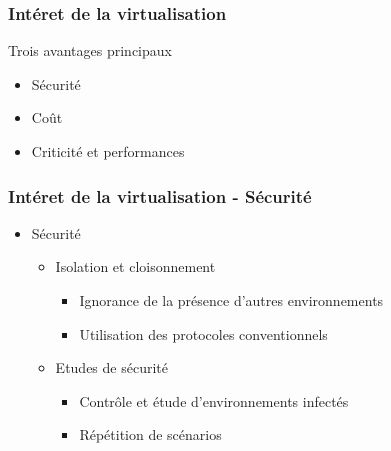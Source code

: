   \begin{frame}
    \frametitle{Intéret de la virtualisation}
    Trois avantages principaux
    \begin{itemize}
      \item Sécurité
      \item Coût
      \item Criticité et performances
    \end{itemize}
  \end{frame}
    
  \begin{frame}
    \frametitle{Intéret de la virtualisation - Sécurité}
    \begin{itemize}
      \item Sécurité
      \begin{itemize}
        \item Isolation et cloisonnement
        \begin{itemize}
          \item Ignorance de la présence d’autres environnements
          \item Utilisation des protocoles conventionnels
        \end{itemize}
        \item Etudes de sécurité
        \begin{itemize}
          \item Contrôle et étude d’environnements infectés 
          \item Répétition de scénarios
        \end{itemize}
      \end{itemize}
    \end{itemize}
  \end{frame}
  
